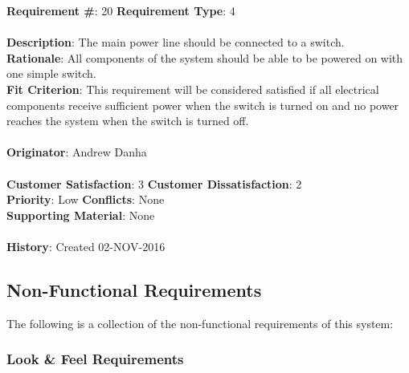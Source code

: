 \documentclass[titlepage]{article}
\begin{document}
\begin{framed}
	\noindent\textbf{Requirement \#}: 20 \hfill \textbf{Requirement Type}: 4 \hfill\\\\
	\noindent\textbf{Description}: The main power line should be connected to a switch.\\
	\textbf{Rationale}: All components of the system should be able to be powered on with one simple switch.\\
	\textbf{Fit Criterion}: This requirement will be considered satisfied if all electrical components receive sufficient power when the switch is turned on and no power reaches the system when the switch is turned off.\\\\
	\textbf{Originator}: Andrew Danha\\\\ 
	\noindent\textbf{Customer Satisfaction}: 3 \hfill 	\textbf{Customer Dissatisfaction}: 2 \hfill\\
	\textbf{Priority}: Low \hfill \textbf{Conflicts}: None \hfill\\
	\textbf{Supporting Material}: None\\\\
	\noindent\textbf{History}: Created 02-NOV-2016
\end{framed}

\subsection{Non-Functional Requirements}
The following is a collection of the non-functional requirements of this system:
\subsubsection{Look \& Feel Requirements}
\end{document}
